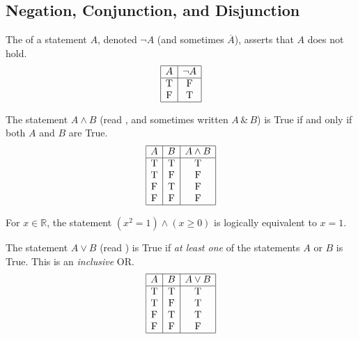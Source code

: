 \subsection{Negation, Conjunction, and Disjunction}

\begin{definition}[Negation]
\label{def:negation}
The  of a statement $A$, denoted $\neg A$ (and sometimes $\overline{A}$), asserts that $A$ does not hold.
\[
\begin{array}{|c|c|}
\hline
A & \neg A \\
\hline
\text{T} & \text{F} \\
\text{F} & \text{T} \\
\hline
\end{array}
\]
\end{definition}

\begin{definition}
\label{def:conjunction}
The statement $A \wedge B$ (read , and sometimes written $A \,\&\, B$) is True if and only if both $A$ and $B$ are True.
\[
\begin{array}{|c|c|c|}
\hline
A & B & A \wedge B \\
\hline
\text{T} & \text{T} & \text{T} \\
\text{T} & \text{F} & \text{F} \\
\text{F} & \text{T} & \text{F} \\
\text{F} & \text{F} & \text{F} \\
\hline
\end{array}
\]
\end{definition}

\begin{example}
For $x \in \mathbb{R}$, the statement $(x^2 = 1) \wedge (x \ge 0)$ is logically equivalent to $x = 1$.
\end{example}

\begin{definition}[Disjunction / OR]
\label{def:disjunction}
The statement $A \vee B$ (read ) is True if \textit{at least one} of the statements $A$ or $B$ is True. This is an \textit{inclusive} OR.
\[
\begin{array}{|c|c|c|}
\hline
A & B & A \vee B \\
\hline
\text{T} & \text{T} & \text{T} \\
\text{T} & \text{F} & \text{T} \\
\text{F} & \text{T} & \text{T} \\
\text{F} & \text{F} & \text{F} \\
\hline
\end{array}
\]
\end{definition}

